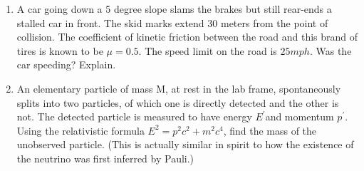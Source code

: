\documentclass[fleqn]{article}
\begin{document}
\begin{enumerate}
    \item A car going down a 5 degree slope slams the brakes but still rear-ends a
    stalled car in front. The skid marks extend 30 meters from the point of
    collision. The coefficient of kinetic friction between the road and this
    brand of tires is known to be $\mu=0.5$. The speed limit on the road is
    $25 mph$. Was the car speeding? Explain.



    \item An elementary particle of mass M, at rest in the lab frame, spontaneously splits into two particles, of which one is directly detected and
    the other is not. The detected particle is measured to have energy $E^{\prime}$and momentum $p^{\prime}$. Using the relativistic formula
    $E^2=p^2 c^2+m^2c^4$, find the mass of the unobserved particle. (This is actually similar in
    spirit to how the existence of the neutrino was first inferred by Pauli.)

     
  \end{enumerate}
\end{document}

